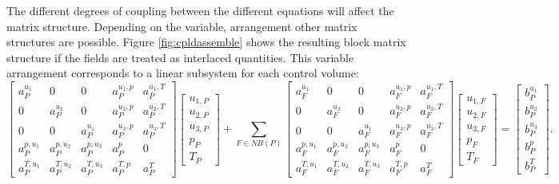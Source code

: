 The different degrees of coupling between the different equations will affect the matrix structure. Depending on the variable, arrangement other matrix structures are possible. Figure \ref{fig:cpldassemble} shows the resulting block matrix structure if the fields are treated as interlaced quantities. This variable arrangement corresponds to a linear subsystem for each control volume:
\begin{displaymath}
\left[
  \begin{array}{ccccc}
    a_P^{u_1}   & 0           & 0           & a_P^{u_1,p} & a_P^{u_1,T} \\[0.5em]
    0           & a_P^{u_2}   & 0           & a_P^{u_2,p} & a_P^{u_2,T} \\[0.5em]
    0           & 0           & a_P^{u_1}   & a_P^{u_3,p} & a_P^{u_3,T} \\[0.5em]
    a_P^{p,u_1} & a_P^{p,u_2} & a_P^{p,u_3} & a_P^{p}     & 0           \\[0.5em]
    a_P^{T,u_1} & a_P^{T,u_2} & a_P^{T,u_3} & a_P^{T,p}   & a_P^{T}
  \end{array}
\right]
\left[
\begin{array}{c}
  u_{1,P} \\[0.5em]
  u_{2,P} \\[0.5em]
  u_{3,P} \\[0.5em]
  p_{P  } \\[0.5em]
  T_{P}
\end{array}
\right]
+
\sum_{F \in NB(P)}
\left[
  \begin{array}{ccccc}
    a_F^{u_1}   & 0           & 0           & a_F^{u_1,p} & a_F^{u_1,T} \\[0.5em]
    0           & a_F^{u_2}   & 0           & a_F^{u_2,p} & a_F^{u_2,T} \\[0.5em]
    0           & 0           & a_F^{u_1}   & a_F^{u_3,p} & a_F^{u_3,T} \\[0.5em]
    a_F^{p,u_1} & a_F^{p,u_2} & a_F^{p,u_3} & a_F^{p}     & 0           \\[0.5em]
    a_F^{T,u_1} & a_F^{T,u_2} & a_F^{T,u_3} & a_F^{T,p}   & a_F^{T}
  \end{array}
\right]
\left[
\begin{array}{c}
  u_{1,F} \\[0.5em]
  u_{2,F} \\[0.5em]
  u_{3,F} \\[0.5em]
  p_{F  } \\[0.5em]
  T_{F}
\end{array}
\right]
=
\left[
\begin{array}{c}
  b_{P}^{u_1} \\[0.5em]
  b_{P}^{u_2} \\[0.5em]
  b_{P}^{u_3} \\[0.5em]
  b_{P}^{p}   \\[0.5em]
  b_{P}^{T}
\end{array}
\right].
\end{displaymath}
